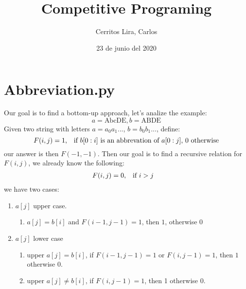 \documentclass{article}
\title{Competitive Programing}
\author{Cerritos Lira, Carlos}
\date{23 de junio del 2020}
\begin{document}
\maketitle

\section*{Abbreviation.py}
Our goal is to find a bottom-up approach, let's analize the example:
\[ a = \text{AbcDE}, b = \text{ABDE} \]
Given two string with letters $a=a_0a_1...$, $b=b_0b_1...$, define: 
\[ F(i,j) = 1 \text{,\quad if $b[0:i]$ is an abbrevation of $a[0:j]$, 0 otherwise} \] 
our answer is then $F(-1,-1)$. Then our goal is to find a recursive relation for $F(i,j)$,
we already know the following:
\begin{align*}
    F(i,j) &= 0 \text{,\quad if $i>j$}
\end{align*}
we have two cases:
\begin{enumerate}
    \item $a[j]$ upper case. 
    \begin{enumerate}
        \item $a[j] = b[i]$ and $F(i-1,j-1) = 1$, then $1$, otherwise $0$
    \end{enumerate}
    \item $a[j]$ lower case
    \begin{enumerate}
        \item upper $a[j] = b[i]$, if $F(i-1,j-1)=1$ or $F(i,j-1)=1$, then $1$ otherwise $0$.
        \item upper $a[j] \neq b[i]$, if $F(i,j-1)=1$, then 1 otherwise $0$.
    \end{enumerate}
\end{enumerate}
\end{document}
